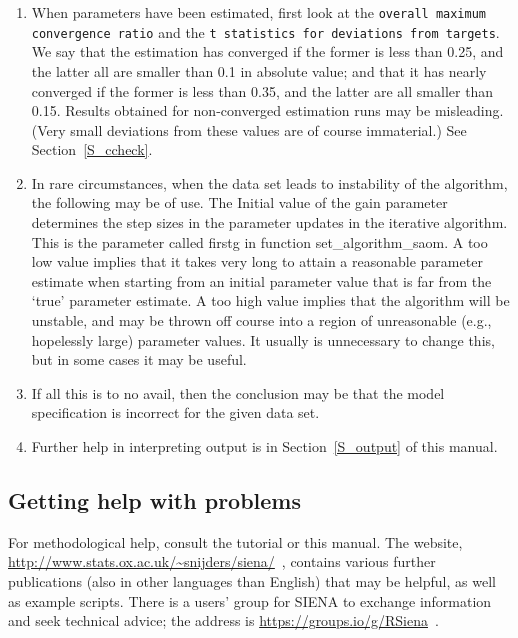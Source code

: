 \documentclass[a4paper,fleqn,11pt]{article}
\newcommand{\+}{\, + \,}
\newcommand{\SI}{{\sf SIENA }}
\begin{document}
\begin{enumerate}
      If Jaccard indices are low because the network is mainly increasing
      (creation of new ties) or decreasing (termination of ties),
      this is no problem for the \SI method. Very sparse networks
      (with most degrees less than 2) also may have lower Jaccard values
      without negative consequences for estimation.
\item When parameters have been estimated, first look at the
     \texttt{overall maximum \\convergence ratio} and the \texttt{t statistics for deviations
      from targets}.
      We say that the estimation has converged if the former is less than 0.25,
      and the latter all are smaller than 0.1 in absolute value;
      and that it has nearly converged if the former is less than 0.35, and the latter are all
      smaller than 0.15. Results obtained for non-converged estimation
      runs may be misleading. (Very small deviations from these
      values are of course immaterial.) See Section~\ref{S_ccheck}.
\item In rare circumstances, when the data set leads to instability
      of the algorithm, the following may be of use.
      The \textsf{Initial value of the gain parameter} determines the
      step sizes in the parameter updates in the iterative
      algorithm.
      This is the parameter called \textsf{firstg}
      in function \textsf{set\_algorithm\_saom}.
      A too low value implies that it takes very long to attain a
      reasonable parameter estimate when starting from an initial
      parameter value that is far from the `true' parameter estimate.
      A too high value implies that the algorithm will be unstable,
      and may be thrown off course into a region of unreasonable
      (e.g., hopelessly large) parameter values. It usually is unnecessary
      to change this, but in some cases it may be useful.
\item If all this is to no avail, then the conclusion may be that the model
      specification is incorrect for the given data set.
\item Further help in interpreting output is in Section~\ref{S_output} of
      this manual.
\end{enumerate}


\subsection{Getting help with problems}
\label{sec:problems}

For methodological help, consult the tutorial  \citet{SnijdersEA10b} or this manual.
The website, {\small\url{http://www.stats.ox.ac.uk/~snijders/siena/}~}, contains
various further publications (also in other languages than English) that may
be helpful, as well as example scripts.
There is a users' group for \SI to exchange information and seek technical
advice; the address is {\small\url{https://groups.io/g/RSiena}~}.
\end{document}
